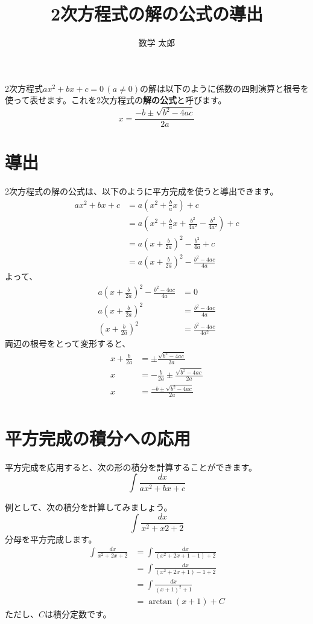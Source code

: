 \documentclass{ltjsarticle}
\title{2次方程式の解の公式の導出}
\author{数学 太郎}
\begin{document}
\maketitle
2次方程式$ax^2 + bx + c = 0\,(a\neq 0)$の解は以下のように係数の四則演算と根号を使って表せます。これを2次方程式の\textbf{解の公式}と呼びます。
\[ x = \frac{-b \pm \sqrt{b^2 -4ac}}{2a} \]

\section{導出}
2次方程式の解の公式は、以下のように平方完成を使うと導出できます。
\begin{align*}
ax^2 + bx + c &= a\left(x^2 + \frac{b}{a}x\right) + c\\
&= a\left(x^2 + \frac{b}{a}x + \frac{b^2}{4a^2} - \frac{b^2}{4a^2}\right) + c\\
&= a\left( x + \frac{b}{2a} \right)^2 - \frac{b^2}{4a} + c\\
&= a\left( x + \frac{b}{2a} \right)^2 - \frac{b^2-4ac}{4a}
\end{align*}
よって、
\begin{align*}
a\left( x + \frac{b}{2a} \right)^2 - \frac{b^2-4ac}{4a} &= 0\\
a\left( x + \frac{b}{2a} \right)^2  &= \frac{b^2-4ac}{4a}\\
\left( x + \frac{b}{2a} \right)^2  &= \frac{b^2-4ac}{4a^2}
\end{align*}
両辺の根号をとって変形すると、
\begin{align*}
x + \frac{b}{2a} &= \pm \frac{\sqrt{b^2-4ac}}{2a}\\
x &= -\frac{b}{2a}\pm \frac{\sqrt{b^2-4ac}}{2a}\\
x &= \frac{-b \pm \sqrt{b^2-4ac}}{2a}\\
\end{align*}
\section{平方完成の積分への応用}
平方完成を応用すると、次の形の積分を計算することができます。
\[ \int \frac{dx}{ax^2 + bx + c} \]

例として、次の積分を計算してみましょう。
\[ \int \frac{dx}{x^2 + x2 + 2} \]
分母を平方完成します。
\begin{align*}
\int \frac{dx}{x^2 + 2x + 2} &= \int \frac{dx}{(x^2 + 2x + 1 - 1) + 2}\\
&= \int \frac{dx}{(x^2 + 2x + 1) - 1 + 2}\\
&= \int \frac{dx}{(x+1)^2 + 1}\\
&= \arctan{(x+1)} + C
\end{align*}
ただし、$C$は積分定数です。
\end{document}
